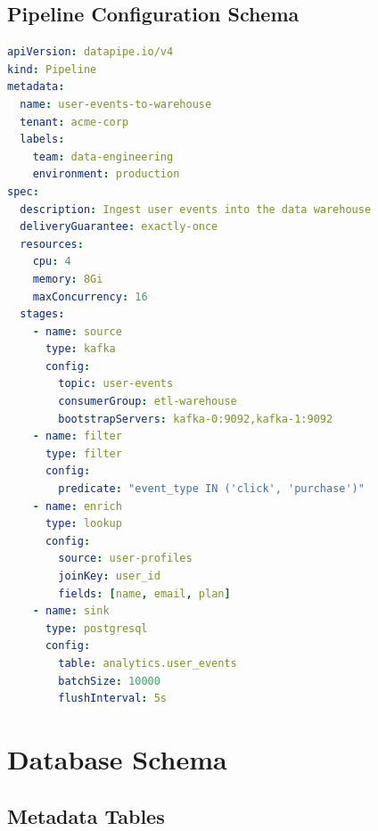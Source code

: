 \documentclass[
    language=english,
    doctype=technical-report,
    institution=none,
    titlestyle=book,
    oneside,
]{../../omnilatex}
\begin{document}
\section{Pipeline Configuration Schema}

\begin{lstlisting}[language=yaml, caption={DataPipe v4 pipeline schema.}]
apiVersion: datapipe.io/v4
kind: Pipeline
metadata:
  name: user-events-to-warehouse
  tenant: acme-corp
  labels:
    team: data-engineering
    environment: production
spec:
  description: Ingest user events into the data warehouse
  deliveryGuarantee: exactly-once
  resources:
    cpu: 4
    memory: 8Gi
    maxConcurrency: 16
  stages:
    - name: source
      type: kafka
      config:
        topic: user-events
        consumerGroup: etl-warehouse
        bootstrapServers: kafka-0:9092,kafka-1:9092
    - name: filter
      type: filter
      config:
        predicate: "event_type IN ('click', 'purchase')"
    - name: enrich
      type: lookup
      config:
        source: user-profiles
        joinKey: user_id
        fields: [name, email, plan]
    - name: sink
      type: postgresql
      config:
        table: analytics.user_events
        batchSize: 10000
        flushInterval: 5s
\end{lstlisting}

\chapter{Database Schema}
\label{sec:database}

\section{Metadata Tables}
\end{document}
